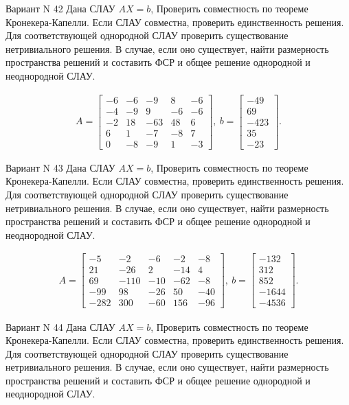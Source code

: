 \documentclass[11pt]{report}
\begin{document}
Вариант N 42
Дана СЛАУ $AX = b$,
Проверить совместность по теореме Кронекера-Капелли. Если СЛАУ совместна, проверить единственность решения.
Для соответствующей однородной СЛАУ проверить существование нетривиального решения. В случае, если оно существует,
найти размерность пространства решений и составить ФСР и общее решение однородной  и неоднородной СЛАУ.


\begin{align*}
 A = \left[\begin{matrix}-6 & -6 & -9 & 8 & -6\\-4 & -9 & 9 & -6 & -6\\-2 & 18 & -63 & 48 & 6\\6 & 1 & -7 & -8 & 7\\0 & -8 & -9 & 1 & -3\end{matrix}\right],
\ b = \left[\begin{matrix}-49\\69\\-423\\35\\-23\end{matrix}\right]. 
 \end{align*}

Вариант N 43
Дана СЛАУ $AX = b$,
Проверить совместность по теореме Кронекера-Капелли. Если СЛАУ совместна, проверить единственность решения.
Для соответствующей однородной СЛАУ проверить существование нетривиального решения. В случае, если оно существует,
найти размерность пространства решений и составить ФСР и общее решение однородной  и неоднородной СЛАУ.


\begin{align*}
 A = \left[\begin{matrix}-5 & -2 & -6 & -2 & -8\\21 & -26 & 2 & -14 & 4\\69 & -110 & -10 & -62 & -8\\-99 & 98 & -26 & 50 & -40\\-282 & 300 & -60 & 156 & -96\end{matrix}\right],
\ b = \left[\begin{matrix}-132\\312\\852\\-1644\\-4536\end{matrix}\right]. 
 \end{align*}

Вариант N 44
Дана СЛАУ $AX = b$,
Проверить совместность по теореме Кронекера-Капелли. Если СЛАУ совместна, проверить единственность решения.
Для соответствующей однородной СЛАУ проверить существование нетривиального решения. В случае, если оно существует,
найти размерность пространства решений и составить ФСР и общее решение однородной  и неоднородной СЛАУ.
\end{document}
